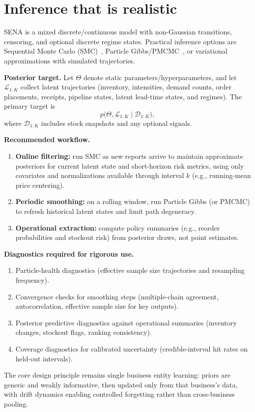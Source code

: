 \documentclass[11pt]{article}
\begin{document}
\section{Inference that is realistic}

SENA is a mixed discrete/continuous model with non-Gaussian transitions, censoring, and optional discrete regime states.
Practical inference options are Sequential Monte Carlo (SMC)~\cite{GordonSalmondSmith1993,DoucetDeFreitasGordon2001}, Particle Gibbs/PMCMC~\cite{AndrieuDoucetHolenstein2010}, or variational approximations with simulated trajectories.

\textbf{Posterior target.} Let $\Theta$ denote static parameters/hyperparameters, and let $\mathcal{L}_{1:K}$ collect latent trajectories (inventory, intensities, demand counts, order placements, receipts, pipeline states, latent lead-time states, and regimes). The primary target is
\[
  p\bigl(\Theta,\mathcal{L}_{1:K}\mid\mathcal{D}_{1:K}\bigr),
\]
where $\mathcal{D}_{1:K}$ includes stock snapshots and any optional signals.

\textbf{Recommended workflow.}
\begin{enumerate}
  \item \textbf{Online filtering:} run SMC as new reports arrive to maintain approximate posteriors for current latent state and short-horizon risk metrics, using only covariates and normalizations available through interval $k$ (e.g., running-mean price centering).
  \item \textbf{Periodic smoothing:} on a rolling window, run Particle Gibbs (or PMCMC) to refresh historical latent states and limit path degeneracy.
  \item \textbf{Operational extraction:} compute policy summaries (e.g., reorder probabilities and stockout risk) from posterior draws, not point estimates.
\end{enumerate}

\textbf{Diagnostics required for rigorous use.}
\begin{enumerate}
  \item Particle-health diagnostics (effective sample size trajectories and resampling frequency).
  \item Convergence checks for smoothing steps (multiple-chain agreement, autocorrelation, effective sample size for key outputs).
  \item Posterior predictive diagnostics against operational summaries (inventory changes, stockout flags, ranking consistency).
  \item Coverage diagnostics for calibrated uncertainty (credible-interval hit rates on held-out intervals).
\end{enumerate}

The core design principle remains single business entity learning: priors are generic and weakly informative, then updated only from that business's data, with drift dynamics enabling controlled forgetting rather than cross-business pooling.

\clearpage


\end{document}
